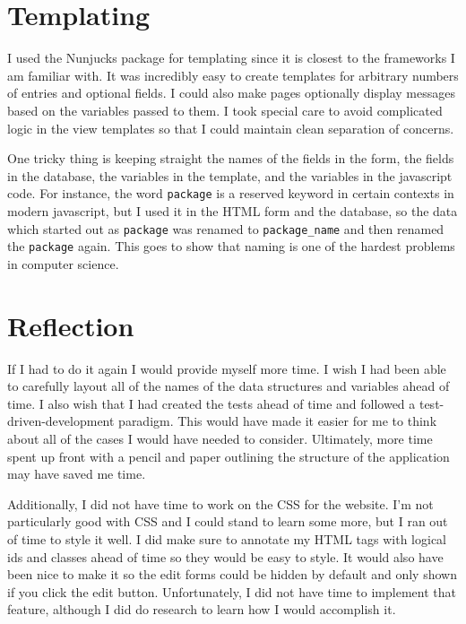 \documentclass[12pt]{article}
\begin{document}
\section{Templating}
I used the Nunjucks package for templating since it is closest to the frameworks I am familiar with. It was incredibly easy to create templates for arbitrary numbers of entries and optional fields. I could also make pages optionally display messages based on the variables passed to them. I took special care to avoid complicated logic in the view templates so that I could maintain clean separation of concerns.

One tricky thing is keeping straight the names of the fields in the form, the fields in the database, the variables in the template, and the variables in the javascript code. For instance, the word \texttt{package} is a reserved keyword in certain contexts in modern javascript, but I used it in the HTML form and the database, so the data which started out as \texttt{package} was renamed to \texttt{package\_name} and then renamed the \texttt{package} again. This goes to show that naming is one of the hardest problems in computer science.

\section{Reflection}
If I had to do it again I would provide myself more time. I wish I had been able to carefully layout all of the names of the data structures and variables ahead of time. I also wish that I had created the tests ahead of time and followed a test-driven-development paradigm. This would have made it easier for me to think about all of the cases I would have needed to consider. Ultimately, more time spent up front with a pencil and paper outlining the structure of the application may have saved me time.

Additionally, I did not have time to work on the CSS for the website. I'm not particularly good with CSS and I could stand to learn some more, but I ran out of time to style it well. I did make sure to annotate my HTML tags with logical ids and classes ahead of time so they would be easy to style. It would also have been nice to make it so the edit forms could be hidden by default and only shown if you click the edit button. Unfortunately, I did not have time to implement that feature, although I did do research to learn how I would accomplish it.
\end{document}
